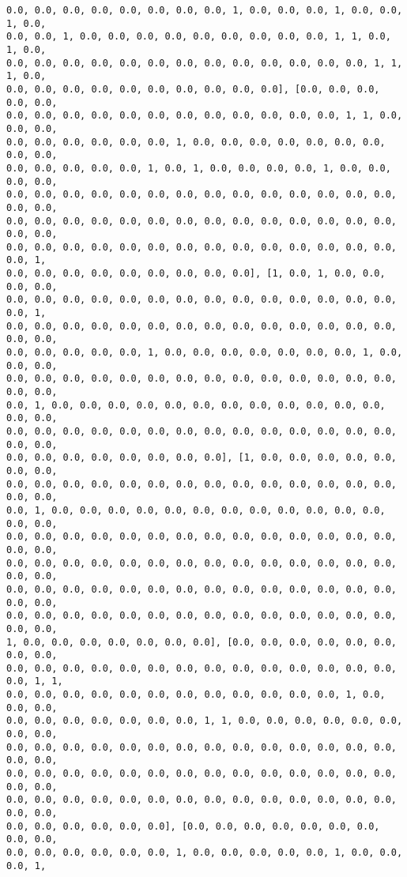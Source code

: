 \documentclass[11pt]{article}
\begin{document}
\begin{Verbatim}[commandchars=\\\{\}]
0.0, 0.0, 0.0, 0.0, 0.0, 0.0, 0.0, 0.0, 1, 0.0, 0.0, 0.0, 1, 0.0, 0.0, 1, 0.0,
0.0, 0.0, 1, 0.0, 0.0, 0.0, 0.0, 0.0, 0.0, 0.0, 0.0, 0.0, 1, 1, 0.0, 1, 0.0,
0.0, 0.0, 0.0, 0.0, 0.0, 0.0, 0.0, 0.0, 0.0, 0.0, 0.0, 0.0, 0.0, 1, 1, 1, 0.0,
0.0, 0.0, 0.0, 0.0, 0.0, 0.0, 0.0, 0.0, 0.0, 0.0], [0.0, 0.0, 0.0, 0.0, 0.0,
0.0, 0.0, 0.0, 0.0, 0.0, 0.0, 0.0, 0.0, 0.0, 0.0, 0.0, 0.0, 1, 1, 0.0, 0.0, 0.0,
0.0, 0.0, 0.0, 0.0, 0.0, 0.0, 1, 0.0, 0.0, 0.0, 0.0, 0.0, 0.0, 0.0, 0.0, 0.0,
0.0, 0.0, 0.0, 0.0, 0.0, 1, 0.0, 1, 0.0, 0.0, 0.0, 0.0, 1, 0.0, 0.0, 0.0, 0.0,
0.0, 0.0, 0.0, 0.0, 0.0, 0.0, 0.0, 0.0, 0.0, 0.0, 0.0, 0.0, 0.0, 0.0, 0.0, 0.0,
0.0, 0.0, 0.0, 0.0, 0.0, 0.0, 0.0, 0.0, 0.0, 0.0, 0.0, 0.0, 0.0, 0.0, 0.0, 0.0,
0.0, 0.0, 0.0, 0.0, 0.0, 0.0, 0.0, 0.0, 0.0, 0.0, 0.0, 0.0, 0.0, 0.0, 0.0, 1,
0.0, 0.0, 0.0, 0.0, 0.0, 0.0, 0.0, 0.0, 0.0], [1, 0.0, 1, 0.0, 0.0, 0.0, 0.0,
0.0, 0.0, 0.0, 0.0, 0.0, 0.0, 0.0, 0.0, 0.0, 0.0, 0.0, 0.0, 0.0, 0.0, 0.0, 1,
0.0, 0.0, 0.0, 0.0, 0.0, 0.0, 0.0, 0.0, 0.0, 0.0, 0.0, 0.0, 0.0, 0.0, 0.0, 0.0,
0.0, 0.0, 0.0, 0.0, 0.0, 1, 0.0, 0.0, 0.0, 0.0, 0.0, 0.0, 0.0, 1, 0.0, 0.0, 0.0,
0.0, 0.0, 0.0, 0.0, 0.0, 0.0, 0.0, 0.0, 0.0, 0.0, 0.0, 0.0, 0.0, 0.0, 0.0, 0.0,
0.0, 1, 0.0, 0.0, 0.0, 0.0, 0.0, 0.0, 0.0, 0.0, 0.0, 0.0, 0.0, 0.0, 0.0, 0.0,
0.0, 0.0, 0.0, 0.0, 0.0, 0.0, 0.0, 0.0, 0.0, 0.0, 0.0, 0.0, 0.0, 0.0, 0.0, 0.0,
0.0, 0.0, 0.0, 0.0, 0.0, 0.0, 0.0, 0.0], [1, 0.0, 0.0, 0.0, 0.0, 0.0, 0.0, 0.0,
0.0, 0.0, 0.0, 0.0, 0.0, 0.0, 0.0, 0.0, 0.0, 0.0, 0.0, 0.0, 0.0, 0.0, 0.0, 0.0,
0.0, 1, 0.0, 0.0, 0.0, 0.0, 0.0, 0.0, 0.0, 0.0, 0.0, 0.0, 0.0, 0.0, 0.0, 0.0,
0.0, 0.0, 0.0, 0.0, 0.0, 0.0, 0.0, 0.0, 0.0, 0.0, 0.0, 0.0, 0.0, 0.0, 0.0, 0.0,
0.0, 0.0, 0.0, 0.0, 0.0, 0.0, 0.0, 0.0, 0.0, 0.0, 0.0, 0.0, 0.0, 0.0, 0.0, 0.0,
0.0, 0.0, 0.0, 0.0, 0.0, 0.0, 0.0, 0.0, 0.0, 0.0, 0.0, 0.0, 0.0, 0.0, 0.0, 0.0,
0.0, 0.0, 0.0, 0.0, 0.0, 0.0, 0.0, 0.0, 0.0, 0.0, 0.0, 0.0, 0.0, 0.0, 0.0, 0.0,
1, 0.0, 0.0, 0.0, 0.0, 0.0, 0.0, 0.0], [0.0, 0.0, 0.0, 0.0, 0.0, 0.0, 0.0, 0.0,
0.0, 0.0, 0.0, 0.0, 0.0, 0.0, 0.0, 0.0, 0.0, 0.0, 0.0, 0.0, 0.0, 0.0, 0.0, 1, 1,
0.0, 0.0, 0.0, 0.0, 0.0, 0.0, 0.0, 0.0, 0.0, 0.0, 0.0, 0.0, 1, 0.0, 0.0, 0.0,
0.0, 0.0, 0.0, 0.0, 0.0, 0.0, 0.0, 1, 1, 0.0, 0.0, 0.0, 0.0, 0.0, 0.0, 0.0, 0.0,
0.0, 0.0, 0.0, 0.0, 0.0, 0.0, 0.0, 0.0, 0.0, 0.0, 0.0, 0.0, 0.0, 0.0, 0.0, 0.0,
0.0, 0.0, 0.0, 0.0, 0.0, 0.0, 0.0, 0.0, 0.0, 0.0, 0.0, 0.0, 0.0, 0.0, 0.0, 0.0,
0.0, 0.0, 0.0, 0.0, 0.0, 0.0, 0.0, 0.0, 0.0, 0.0, 0.0, 0.0, 0.0, 0.0, 0.0, 0.0,
0.0, 0.0, 0.0, 0.0, 0.0, 0.0], [0.0, 0.0, 0.0, 0.0, 0.0, 0.0, 0.0, 0.0, 0.0,
0.0, 0.0, 0.0, 0.0, 0.0, 0.0, 1, 0.0, 0.0, 0.0, 0.0, 0.0, 1, 0.0, 0.0, 0.0, 1,

\end{Verbatim}
\end{document}
